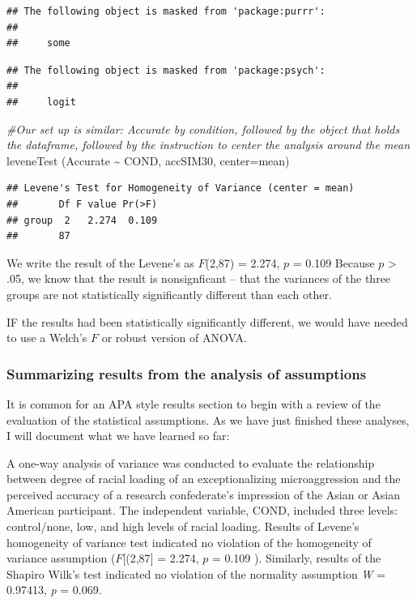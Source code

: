\documentclass[
  english,
]{book}
\newenvironment{Shaded}{\begin{snugshade}}{\end{snugshade}}
\newcommand{\AttributeTok}[1]{\textcolor[rgb]{0.77,0.63,0.00}{#1}}
\newcommand{\CommentTok}[1]{\textcolor[rgb]{0.56,0.35,0.01}{\textit{#1}}}
\newcommand{\FunctionTok}[1]{\textcolor[rgb]{0.00,0.00,0.00}{#1}}
\newcommand{\NormalTok}[1]{#1}
\newcommand{\SpecialCharTok}[1]{\textcolor[rgb]{0.00,0.00,0.00}{#1}}
\begin{document}
\begin{verbatim}
## The following object is masked from 'package:purrr':
## 
##     some
\end{verbatim}

\begin{verbatim}
## The following object is masked from 'package:psych':
## 
##     logit
\end{verbatim}

\begin{Shaded}
\begin{Highlighting}[]
\CommentTok{\#Our set up is similar:  Accurate by condition, followed by the object that holds the dataframe, followed by the instruction to center the analysis around the mean}
\FunctionTok{leveneTest}\NormalTok{ (Accurate }\SpecialCharTok{\textasciitilde{}}\NormalTok{ COND, accSIM30, }\AttributeTok{center=}\NormalTok{mean)}
\end{Highlighting}
\end{Shaded}

\begin{verbatim}
## Levene's Test for Homogeneity of Variance (center = mean)
##       Df F value Pr(>F)
## group  2   2.274  0.109
##       87
\end{verbatim}

We write the result of the Levene's as \(F\)(2,87) = 2.274, \(p\) = 0.109 Because \(p\) \textgreater{} .05, we know that the result is nonsignficant -- that the variances of the three groups are not statistically significantly different than each other.

IF the results had been statistically significantly different, we would have needed to use a Welch's \(F\) or robust version of ANOVA.

\hypertarget{summarizing-results-from-the-analysis-of-assumptions}{%
\subsubsection{Summarizing results from the analysis of assumptions}\label{summarizing-results-from-the-analysis-of-assumptions}}

It is common for an APA style results section to begin with a review of the evaluation of the statistical assumptions. As we have just finished these analyses, I will document what we have learned so far:

A one-way analysis of variance was conducted to evaluate the relationship between degree of racial loading of an exceptionalizing microaggression and the perceived accuracy of a research confederate's impression of the Asian or Asian American participant. The independent variable, COND, included three levels: control/none, low, and high levels of racial loading. Results of Levene's homogeneity of variance test indicated no violation of the homogeneity of variance assumption (\(F\){[}(2,87{]} = 2.274, \(p\) = 0.109 ). Similarly, results of the Shapiro Wilk's test indicated no violation of the normality assumption \emph{W} = 0.97413, \emph{p} = 0.069.
\end{document}
